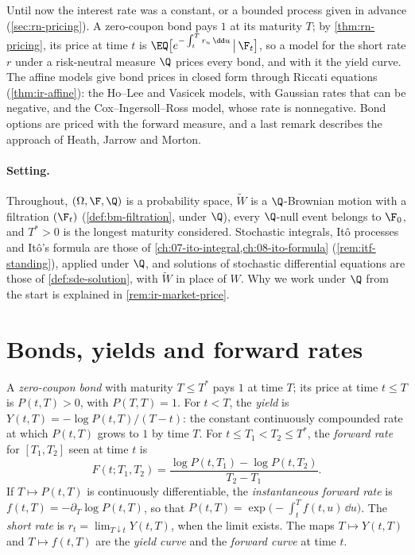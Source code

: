 
Until now the interest rate was a constant, or a bounded process given in advance
(\cref{sec:rn-pricing}). A zero-coupon bond pays $1$ at its maturity $T$; by \cref{thm:rn-pricing},
its price at time $t$ is $\EQ\big[e^{-\int_t^Tr_u\,\dd u}\,\big|\,\F_t\big]$, so a model for the short
rate $r$ under a risk-neutral measure $\Q$ prices every bond, and with it the yield curve. The
affine models give bond prices in closed form through Riccati equations (\cref{thm:ir-affine}):
the Ho--Lee and Vasicek models, with Gaussian rates that can be negative, and the
Cox--Ingersoll--Ross model, whose rate is nonnegative. Bond options are priced with the forward
measure, and a last remark describes the approach of Heath, Jarrow and Morton.

\paragraph{Setting.} Throughout, $(\Omega,\F,\Q)$ is a probability space, $\widetilde W$ is a
$\Q$-Brownian motion with a filtration $(\F_t)$ (\cref{def:bm-filtration}, under $\Q$), every
$\Q$-null event belongs to $\F_0$, and $T^*>0$ is the longest maturity considered. Stochastic
integrals, It\^o processes and It\^o's formula are those of
\cref{ch:07-ito-integral,ch:08-ito-formula} (\cref{rem:itf-standing}), applied under $\Q$, and
solutions of stochastic differential equations are those of \cref{def:sde-solution}, with
$\widetilde W$ in place of $W$. Why we work under $\Q$ from the start is explained in
\cref{rem:ir-market-price}.

\section{Bonds, yields and forward rates}\label{sec:ir-bonds}

\begin{definition}\label{def:ir-bond}
A \emph{zero-coupon bond} with maturity $T\le T^*$ pays $1$ at time $T$; its price at time
$t\le T$ is $P(t,T)>0$, with $P(T,T)=1$. For $t<T$, the \emph{yield} is
$Y(t,T)=-\log P(t,T)/(T-t)$: the constant continuously compounded rate at which $P(t,T)$ grows
to $1$ by time $T$. For $t\le T_1<T_2\le T^*$, the \emph{forward rate} for $[T_1,T_2]$ seen at
time $t$ is
\begin{equation}\label{eq:ir-forward}
  F(t;T_1,T_2)=\frac{\log P(t,T_1)-\log P(t,T_2)}{T_2-T_1}.
\end{equation}
If $T\mapsto P(t,T)$ is continuously differentiable, the \emph{instantaneous forward rate} is
$f(t,T)=-\partial_T\log P(t,T)$, so that $P(t,T)=\exp\big(-\int_t^Tf(t,u)\,\dd u\big)$. The
\emph{short rate} is $r_t=\lim_{T\downarrow t}Y(t,T)$, when the limit exists. The maps
$T\mapsto Y(t,T)$ and $T\mapsto f(t,T)$ are the \emph{yield curve} and the \emph{forward curve}
at time $t$.
\end{definition}

